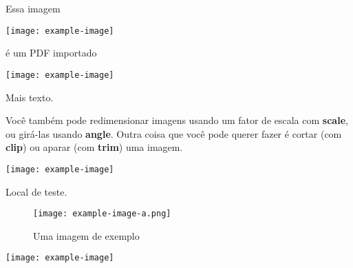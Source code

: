 \documentclass[brazilian, twocolumn]{article}
\begin{document}
Essa imagem
\begin{center}
    \texttt{[image: example-image]}
\end{center}
é um PDF importado

\begin{center}
    \texttt{[image: example-image]}
\end{center}
Mais texto.

Você também pode redimensionar imagens usando um fator de escala com \textbf{scale}, ou girá-las usando \textbf{angle}. Outra coisa que você pode querer fazer é cortar (com \textbf{clip}) ou aparar (com \textbf{trim}) uma imagem.
\begin{center}
    \texttt{[image: example-image]}
\end{center}

\lipsum[1-4]

Local de teste.

\begin{figure}[ht]
    \centering %
    \texttt{[image: example-image-a.png]}
    \caption{Uma imagem de exemplo}
\end{figure}

\lipsum[6-10]

\begin{center}
    \texttt{[image: example-image]}
\end{center}
\end{document}
